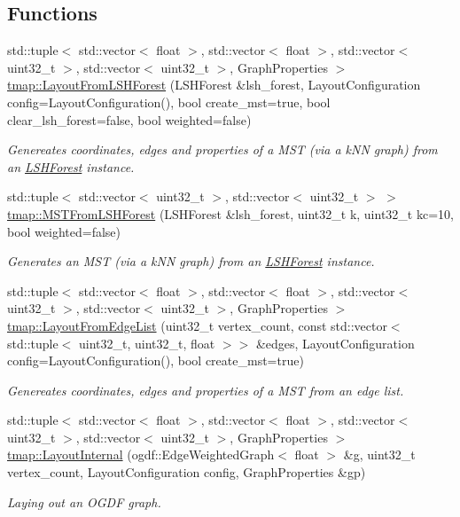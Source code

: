 \subsection*{Functions}
\begin{DoxyCompactItemize}
\item 
std\+::tuple$<$ std\+::vector$<$ float $>$, std\+::vector$<$ float $>$, std\+::vector$<$ uint32\+\_\+t $>$, std\+::vector$<$ uint32\+\_\+t $>$, Graph\+Properties $>$ \hyperlink{layout_8hh_acd9c409403d706202320359541674ba8}{tmap\+::\+Layout\+From\+L\+S\+H\+Forest} (L\+S\+H\+Forest \&lsh\+\_\+forest, Layout\+Configuration config=Layout\+Configuration(), bool create\+\_\+mst=true, bool clear\+\_\+lsh\+\_\+forest=false, bool weighted=false)
\begin{DoxyCompactList}\small\item\em Genereates coordinates, edges and properties of a M\+ST (via a k\+NN graph) from an \hyperlink{classtmap_1_1LSHForest}{L\+S\+H\+Forest} instance. \end{DoxyCompactList}\item 
std\+::tuple$<$ std\+::vector$<$ uint32\+\_\+t $>$, std\+::vector$<$ uint32\+\_\+t $>$ $>$ \hyperlink{layout_8hh_a3d7180c2fcc2a1ec72838f18177d6840}{tmap\+::\+M\+S\+T\+From\+L\+S\+H\+Forest} (L\+S\+H\+Forest \&lsh\+\_\+forest, uint32\+\_\+t k, uint32\+\_\+t kc=10, bool weighted=false)
\begin{DoxyCompactList}\small\item\em Generates an M\+ST (via a k\+NN graph) from an \hyperlink{classtmap_1_1LSHForest}{L\+S\+H\+Forest} instance. \end{DoxyCompactList}\item 
std\+::tuple$<$ std\+::vector$<$ float $>$, std\+::vector$<$ float $>$, std\+::vector$<$ uint32\+\_\+t $>$, std\+::vector$<$ uint32\+\_\+t $>$, Graph\+Properties $>$ \hyperlink{layout_8hh_a780993ad8dd7e349b77f55895cc33451}{tmap\+::\+Layout\+From\+Edge\+List} (uint32\+\_\+t vertex\+\_\+count, const std\+::vector$<$ std\+::tuple$<$ uint32\+\_\+t, uint32\+\_\+t, float $>$$>$ \&edges, Layout\+Configuration config=Layout\+Configuration(), bool create\+\_\+mst=true)
\begin{DoxyCompactList}\small\item\em Genereates coordinates, edges and properties of a M\+ST from an edge list. \end{DoxyCompactList}\item 
std\+::tuple$<$ std\+::vector$<$ float $>$, std\+::vector$<$ float $>$, std\+::vector$<$ uint32\+\_\+t $>$, std\+::vector$<$ uint32\+\_\+t $>$, Graph\+Properties $>$ \hyperlink{layout_8hh_a126dbc6ec8355732c528abb2877e60d4}{tmap\+::\+Layout\+Internal} (ogdf\+::\+Edge\+Weighted\+Graph$<$ float $>$ \&g, uint32\+\_\+t vertex\+\_\+count, Layout\+Configuration config, Graph\+Properties \&gp)
\begin{DoxyCompactList}\small\item\em Laying out an O\+G\+DF graph. \end{DoxyCompactList}\end{DoxyCompactItemize}


